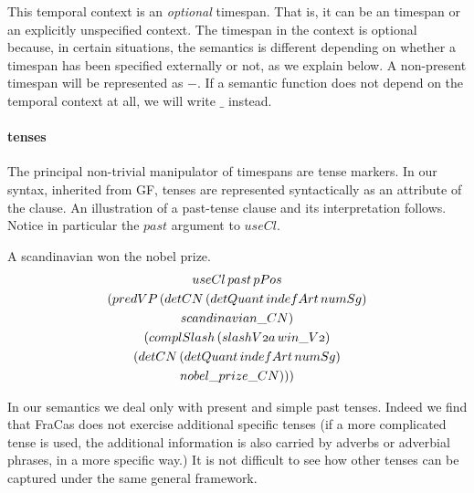 \documentclass[a4paper,11pt]{article}
\newcommand\onelingex[1]{\begin{lingex}\item #1 \end{lingex}}
\newcommand\jp[1]{\todo[backgroundcolor=blue!10]{JP: #1}}
\begin{document}
This temporal context is an \emph{optional} timespan. That is, it can
be an timespan or an explicitly unspecified context.
\newcommand\nospan{\ensuremath{-}}
\newcommand\anyspan{\ensuremath{\_}} The timespan in the context is
optional because, in certain situations, the semantics is different
depending on whether a timespan has been specified externally or not,
as we explain below. A non-present timespan will be represented as
\nospan{}. If a semantic function does not depend on the temporal
context at all, we will write \anyspan{} instead.

\paragraph{tenses}

\newcommand\varid[1]{\mathnormal{#1}}
%
The principal non-trivial manipulator of timespans are tense
markers. In our syntax, inherited from GF, tenses are represented
syntactically as an attribute of the clause. An illustration of a
past-tense clause and its interpretation follows. Notice in particular
the $past$ argument to $useCl$.

\onelingex{A scandinavian won the nobel prize.\label{ex:nobel}
\\
{\small\begin{multline*}
\varid{useCl}\, \varid{past}\, \varid{pPos}\\ (\varid{predVP}\, (\varid{detCN}\, (\varid{detQuant}\, \varid{indefArt}\, \varid{numSg})\\ \varid{scandinavian\_CN})\\ (\varid{complSlash}\, (\varid{slashV2a}\, \varid{win\_V2})\\ (\varid{detCN}\, (\varid{detQuant}\, \varid{indefArt}\, \varid{numSg})\\ \varid{nobel\_prize\_CN})))
\end{multline*}
}}
In our semantics we deal only with present and simple past
tenses. \jp{Is this enough for theory?} Indeed we find that FraCas
does not exercise additional specific tenses (if a more complicated
tense is used, the additional information is also carried by adverbs
or adverbial phrases, in a more specific way.) It is not difficult to see how other tenses can be captured under the same general framework. 
\end{document}
